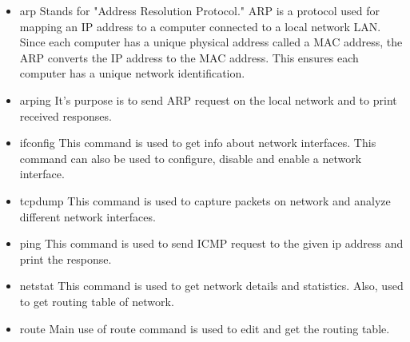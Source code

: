 \documentclass[14pt]{extarticle}
\begin{document}
    \begin{itemize}
        \item \textsf{arp} 
        Stands for "Address Resolution Protocol." 
        ARP is a protocol used for mapping an IP address to a computer connected to a local network LAN. 
        Since each computer has a unique physical address called a MAC address, the ARP converts the IP address to the MAC address. 
        This ensures each computer has a unique network identification.
        \item \textsf{arping}
        It's purpose is to send ARP request on the local network and to print received responses.
        \item \textsf{ifconfig}
        This command is used to get info about network interfaces.
        This command can also be used to configure, disable and enable a network interface.
        \item \textsf{tcpdump}
        This command is used to capture packets on network and analyze different network interfaces. 
        \item \textsf{ping}
        This command is used to send ICMP request to the given ip address and print the response.
        \item \textsf{netstat}
        This command is used to get network details and statistics. Also, used to get routing table of network.
        \item \textsf{route}
        Main use of route command is used to edit and get the routing table.
    \end{itemize}
    
    \vspace{1cm}
\end{document}
